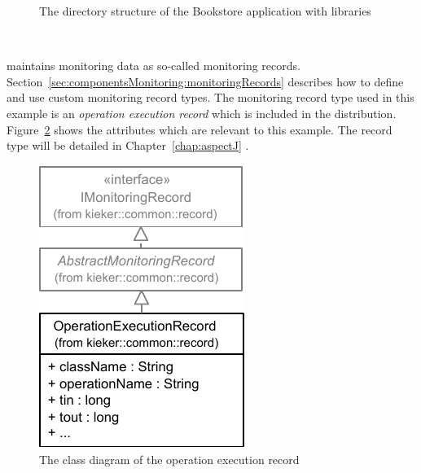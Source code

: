 \begin{figure}[H]
\begin{graybox}
\end{graybox}
\caption{The directory structure of the Bookstore application with \Kieker{} libraries}
\label{fig:KiekerBookstoreExample}
\end{figure}


\quad\

\noindent \Kieker{} maintains monitoring data as  so-called monitoring records. %
Section~\ref{sec:componentsMonitoring:monitoringRecords} describes how to define and use custom monitoring record types. %
The monitoring record type used in this example is an \textit{operation execution record} which %
is included in the \Kieker{} distribution. %
Figure~\ref{fig:OperationExecutionRecordClassDiagram} shows the %
attributes which  are relevant to this example. %
The record type will be detailed in Chapter~\ref{chap:aspectJ} .

\begin{figure}[H]
\begin{centering}
\includegraphics[scale=1]{images/kieker_OperationExecutionRecord-notraceattributes-inheritance}%
\caption{The class diagram of the operation execution record}
\label{fig:OperationExecutionRecordClassDiagram}
\end{centering}
\end{figure}

